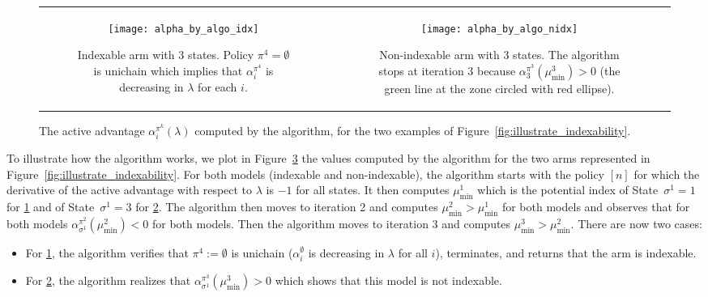 \begin{figure}[ht]
    \begin{tabular}{cc}
        \begin{subfigure}[t]{0.48\linewidth}
            \texttt{[image: alpha\_by\_algo\_idx]}
            \caption{Indexable arm with $3$ states. Policy $\pi^4=\emptyset$ is unichain which implies that $\alpha^{\pi^4}_i$ is decreasing in $\lambda$ for each $i$.}
            \label{fig:illustrate_algo_ind}
        \end{subfigure}
        &\begin{subfigure}[t]{0.48\linewidth}
            \texttt{[image: alpha\_by\_algo\_nidx]}
            \caption{Non-indexable arm with $3$ states. The algorithm stops at iteration $3$ because $\alpha^{\pi^3}_3(\mu^3_{\min})>0$ (the green line at the zone circled with red ellipse).}
            \label{fig:illustrate_algo_nind}
        \end{subfigure}            
    \end{tabular}
    \caption{
        The active advantage $\alpha^{\pi^k}_i(\lambda)$ computed by the algorithm, for the two examples of Figure~\ref{fig:illustrate_indexability}.
    }
    \label{fig:illustrate_algo}
\end{figure}

\medskip

To illustrate how the algorithm works, we plot in Figure~\ref{fig:illustrate_algo} the values computed by the algorithm for the two arms represented in Figure~\ref{fig:illustrate_indexability}. For both models (indexable and non-indexable), the algorithm starts with the policy $[n]$ for which the derivative of the active advantage with respect to $\lambda$ is $-1$ for all states. It then computes $\mu^1_{\min}$ which is the potential index of State~$\sigma^1=1$ for \ref{fig:illustrate_algo_ind} and of State~$\sigma^1=3$ for \ref{fig:illustrate_algo_nind}. The algorithm then moves to iteration 2 and computes $\mu^2_{\min}>\mu^1_{\min}$ for both models and observes that for both models $\alpha^{\pi^2}_{\sigma^1}(\mu^2_{\min})<0$ for both models. Then the algorithm moves to iteration $3$ and computes $\mu^3_{\min}>\mu^2_{\min}$. There are now two cases: 
\begin{itemize}
    \item For \ref{fig:illustrate_algo_ind}, the algorithm verifies that $\pi^4:=\emptyset$ is unichain ($\alpha^{\emptyset}_i$ is decreasing in $\lambda$ for all $i$), terminates, and returns that the arm is indexable.
    \item For \ref{fig:illustrate_algo_nind}, the algorithm realizes that $\alpha^{\pi^3}_{\sigma^1}(\mu^3_{\min})>0$ which shows that this model is not indexable. 
\end{itemize}

